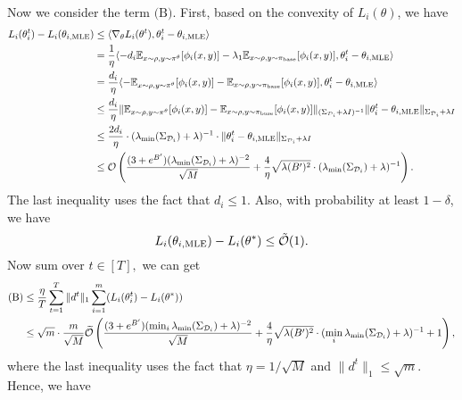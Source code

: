 Now we consider the term $\text{(B)}.$ First, based on the convexity of $L_i(\theta)$, we have 
\begin{align*}
    L_i(\theta_i^t) - L_i(\theta_{i,\mathrm{MLE}}) & \le \langle \nabla_\theta L_i(\theta^t), \theta_i^t - \theta_{i,\mathrm{MLE}}\rangle \\
    & = \frac{1}{\eta} \langle -d_i \mathbb{E}_{x\sim \rho, y\sim \pi^\theta}[\phi_i(x,y)] - \lambda_1 \mathbb{E}_{x\sim \rho, y\sim \pi_{\mathrm{base}}}[\phi_i(x,y)], \theta_i^t - \theta_{i,\mathrm{MLE}}\rangle\\
     & = \frac{d_i}{\eta}\langle -\mathbb{E}_{x\sim \rho, y\sim \pi^\theta}[\phi_i(x,y)] - \mathbb{E}_{x\sim \rho, y\sim \pi_{\mathrm{base}}}[\phi_i(x,y)], \theta_i^t - \theta_{i,\mathrm{MLE}}  \rangle \\
     &\le \frac{d_i}{\eta} \|\mathbb{E}_{x\sim \rho, y\sim \pi^\theta}[\phi_i(x,y)]-\mathbb{E}_{x\sim \rho, y\sim \pi_{\mathrm{base}}}[\phi_i(x,y)]\|_{(\Sigma_{\mathcal{D}_i} + \lambda I )^{-1}}\|\theta_i^t - \theta_{i,\mathrm{MLE}}\|_{\Sigma_{\mathcal{D}_i} + \lambda I }\\
     &\le \frac{2d_i}{\eta}\cdot (\lambda_{\min}(\Sigma_{\mathcal{D}_i})+\lambda)^{-1}\cdot \|\theta_i^t - \theta_{i,\mathrm{MLE}}\|_{\Sigma_{\mathcal{D}_i} + \lambda I }\\
     &\le \mathcal{O}\left( \frac{(3+e^{B'})(\lambda_{\min}(\Sigma_{\mathcal{D}_i}) + \lambda)^{-2}}{\sqrt{M}} + \frac{4}{\eta}\sqrt{\lambda (B')^2}\cdot (\lambda_{\min}(\Sigma_{\mathcal{D}_i})+\lambda )^{-1}\right).
\end{align*}
The last inequality uses the fact that $d_i \le 1.$
Also, with probability at least $1-\delta$, we have 
$$L_i(\theta_{i,\mathrm{MLE}}) - L_i(\theta^*) \le \tilde{\mathcal{O}}(1).$$
Now sum over $t \in [T], $ we can get 
\begin{align*}
    \text{(B)}&\le \frac{\eta}{T}\sum_{t=1}^T\|d^t\|_1 \sum_{i=1}^m (L_i(\theta_i^t) - L_i(\theta^*))\\
    & \le \sqrt{m}\cdot \frac{m}{\sqrt{M}}\widetilde{\mathcal{O}}\left(\frac{(3+e^{B'})(\min_i\lambda_{\min}(\Sigma_{\mathcal{D}_i}) + \lambda)^{-2}}{\sqrt{M}} + \frac{4}{\eta}\sqrt{\lambda (B')^2}\cdot (\min_i\lambda_{\min}(\Sigma_{\mathcal{D}_i})+\lambda )^{-1} + 1\right),
\end{align*}
where the last inequality uses the fact that $\eta = 1/\sqrt{M}$ and $\|d^t\|_1 \le \sqrt{m}$.
Hence, we have 
